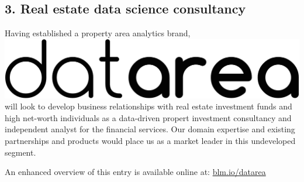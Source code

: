 \documentclass[
10pt, %
a4paper, %
oneside, %
headinclude,footinclude, %
BCOR5mm, %
]{scrartcl}
\newcommand*{\logo}{\includegraphics[scale=.04]{Figures/logotext.png}}
\begin{document}
\subsection*{3. Real estate data science consultancy}

Having established a property area analytics brand, \logo\hspace{.1em}
will look to develop business relationships with real estate
investment funds and high net-worth individuals as a data-driven
propert investment consultancy and independent analyst for the
financial services. Our domain expertise and existing partnerships and
products would place us as a market leader in this undeveloped segment.


\vspace{1em}
\begin{flushright}
{\small An enhanced overview of this entry is available online at: \leavevmode\href{http://blm.io/datarea}{blm.io/datarea}}
\end{flushright}
\end{document}
